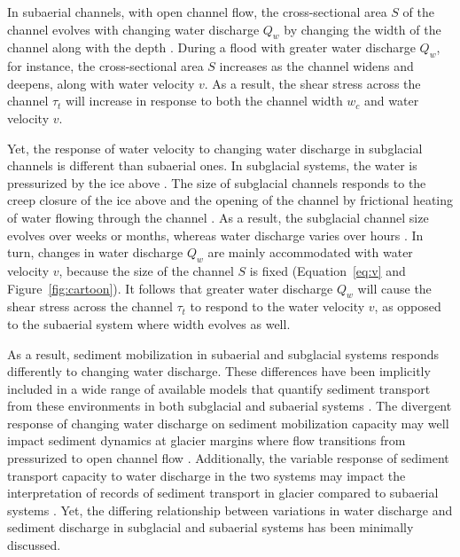 \documentclass[11pt]{article}
\begin{document}
\begin{spacing}{1}
  In subaerial channels, with open channel flow, the cross-sectional area $S$ of the channel evolves with changing water discharge $Q_w$  by changing the width of the channel along with the depth \citep{leopold1953}. During a flood with greater water discharge $Q_w$, for instance, the cross-sectional area $S$ increases as the channel widens and deepens, along with water velocity $v$. As a result, the shear stress across the channel $\tau_t$ will increase in response to both the channel width $w_c$  and water velocity $v$. 

  Yet, the response of water velocity to changing water discharge in subglacial channels is different than subaerial ones.
  In subglacial systems, the water is pressurized by the ice above \citep{shreve1972}.
  The size of subglacial channels responds to the creep closure of the ice above and the opening of the channel by frictional heating of water flowing through the channel \citep{rothlisberger1972}.
  As a result, the subglacial channel size evolves over weeks or months, whereas water discharge varies over hours \citep[e.g.][]{iken1986,andrews2014,nanni2020}.
  In turn, changes in water discharge $Q_w$ are mainly accommodated with water velocity $v$, because the size of the channel $S$ is fixed (Equation~\ref{eq:v} and Figure~\ref{fig:cartoon}).
  It follows that greater water discharge $Q_w$ will cause the shear stress across the channel $\tau_t$ to respond to the water velocity $v$, as opposed to the subaerial system where width evolves as well. 

  As a result, sediment mobilization in subaerial and subglacial systems responds differently to changing water discharge.
  These differences have been implicitly included in a wide range of available models that  quantify sediment transport from these environments in both subglacial and subaerial systems  \citep[e.g.][]{walder1994,tucker1997,creyts2013,wickert2019,hewitt2019}.
  The divergent response of changing water discharge on sediment mobilization capacity may well impact sediment dynamics at glacier margins where flow transitions from pressurized to open channel flow \citep[e.g.][]{lane2016}.
  Additionally, the variable response of sediment transport capacity to water discharge in the two systems may impact the interpretation of records of sediment transport in glacier compared to subaerial systems \citep[e.g.][]{muller1968,richards2003,ganti2016}.
  Yet, the differing relationship between variations in water discharge and sediment discharge in subglacial and subaerial systems has been minimally discussed.
  

\end{spacing}
\end{document}
